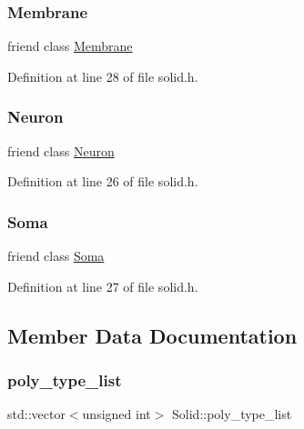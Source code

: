 \subsubsection{\texorpdfstring{Membrane}{Membrane}}
{\footnotesize\ttfamily friend class \hyperlink{class_membrane}{Membrane}\hspace{0.3cm}{\ttfamily [friend]}}



Definition at line 28 of file solid.\+h.

\mbox{\label{class_solid_aa410d74ba34b18a9f6bdf24323c4ee5b}} 
\subsubsection{\texorpdfstring{Neuron}{Neuron}}
{\footnotesize\ttfamily friend class \hyperlink{class_neuron}{Neuron}\hspace{0.3cm}{\ttfamily [friend]}}



Definition at line 26 of file solid.\+h.

\mbox{\label{class_solid_aaa07b7b364b620b9a781f30a5cd9f5ea}} 
\subsubsection{\texorpdfstring{Soma}{Soma}}
{\footnotesize\ttfamily friend class \hyperlink{class_soma}{Soma}\hspace{0.3cm}{\ttfamily [friend]}}



Definition at line 27 of file solid.\+h.



\subsection{Member Data Documentation}
\mbox{\label{class_solid_ad63206ff20f38b621db482b01801c4c5}} 
\subsubsection{\texorpdfstring{poly\+\_\+type\+\_\+list}{poly\_type\_list}}
{\footnotesize\ttfamily std\+::vector$<$unsigned int$>$ Solid\+::poly\+\_\+type\+\_\+list\hspace{0.3cm}{\ttfamily [protected]}}



